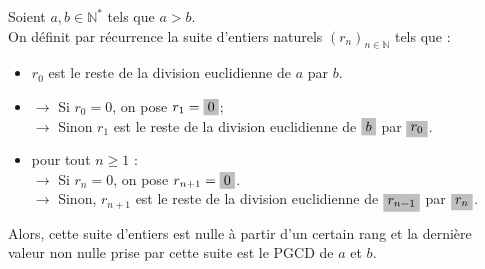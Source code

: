 \documentclass[12pt]{article}
\newcommand{\hideM}[1]{\mbox{\vphantom{$#1$}\smash{\colorbox{gray!50}{$\displaystyle #1$}}} }
\theoremstyle{break}
\begin{document}
\begin{proposition}{}{}
Soient $a, b \in \mathbb{N}^{*}$ tels que $a>b$.\\
On définit par récurrence la suite d'entiers naturels $\left(r_{n}\right)_{n \in \mathbb{N}}$ tels que :

\begin{itemize}[noitemsep,topsep=0pt]
  \item $r_{0}$ est le reste de la division euclidienne de $a$ par $b$.
  \item $\rightarrow$ Si $r_{0}=0$, on pose $r_{1}=\hideM{0}$;\\
$\rightarrow$ Sinon $r_{1}$ est le reste de la division euclidienne de $\hideM{b}$ par $ \hideM{r_{0}}$.
  \item pour tout $n \geqslant 1$ :\\
$\rightarrow$ Si $r_{n}=0$, on pose $r_{n+1}=\hideM{0}$.\\
$\rightarrow$ Sinon, $r_{n+1}$ est le reste de la division euclidienne de $\hideM{r_{n-1}}$ par $\hideM{r_{n}}$.
\end{itemize}
Alors, cette suite d'entiers est nulle à partir d'un certain rang et la dernière valeur non nulle prise par cette suite est le PGCD de $a$ et $b$.
\end{proposition}
\end{document}
